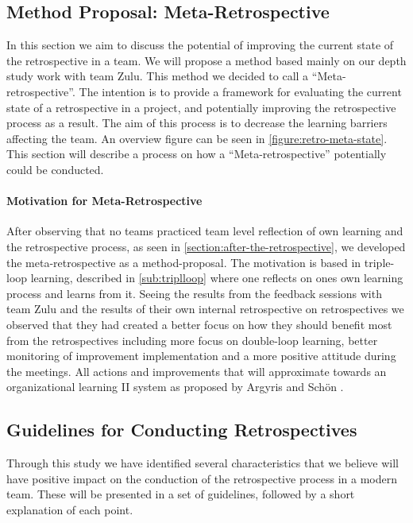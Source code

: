 \subsection{Method Proposal: Meta-Retrospective}
\label{section:Method-propsal}
In this section we aim to discuss the potential of improving the current state of the retrospective in a team. We will propose a method based mainly on our depth study work with team Zulu. This method we decided to call a ``Meta-retrospective''. The intention is to provide a framework for evaluating the current state of a retrospective in a project, and potentially improving the retrospective process as a result. The aim of this process is to decrease the learning barriers affecting the team. An overview figure can be seen in \autoref{figure:retro-meta-state}. This section will describe a process on how a ``Meta-retrospective'' potentially could be conducted.

\paragraph{Motivation for Meta-Retrospective}
After observing that no teams practiced team level reflection of own learning and the retrospective process, as seen in \autoref{section:after-the-retrospective}, we developed the meta-retrospective as a method-proposal. The motivation is based in triple-loop learning, described in \autoref{sub:triplloop} where one reflects on ones own learning process and learns from it. Seeing the results from the feedback sessions with team Zulu and the results of their own internal retrospective on retrospectives we observed that they had created a better focus on how they should benefit most from the retrospectives including more focus on double-loop learning, better monitoring of improvement implementation and a more positive attitude during the meetings. All actions and improvements that will approximate towards an organizational learning II system as proposed by Argyris and Schön \cite{Argyris1996}.

\subsection{Guidelines for Conducting Retrospectives}

Through this study we have identified several characteristics that we believe will have positive impact on the conduction of the retrospective process in a modern team. These will be presented in a set of guidelines, followed by a short explanation of each point.

